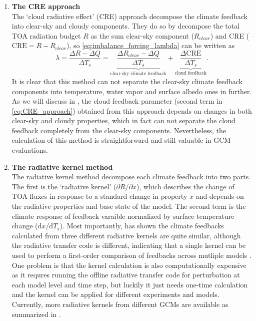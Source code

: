 \begin{enumerate}[label={(\arabic*)}]
    \item \textbf{The CRE approach}\\
    The `cloud radiative effect' (CRE) approach \citep[or CRF in][]{Cess1990intercomparison, Cess1996cloud} decompose the climate feedback into clear-sky and cloudy components. They do so by decompose the total TOA radiation budget $R$ as the sum clear-sky component ($R_{clear}$) and CRE ($\mathrm{CRE}=R-R_{clear}$), so \eqref{eq:imbalance_forcing_lambda} can be written as
    \begin{equation}
        \lambda = \frac{\Delta R - \Delta Q}{\Delta T_s} = \underbrace{\frac{\Delta R_{clear} - \Delta Q}{\Delta T_s}}_{\text{clear-sky climate feedback}} + \underbrace{\frac{\Delta\mathrm{CRE}}{\Delta T_s}}_{\text{cloud feedback}}.
        \label{eq:CRE_approach}
    \end{equation}
    It is clear that this method can not separate the clear-sky climate feedback components into temperature, water vapor and surface albedo ones in further. As we will discuss in , the cloud feedback parameter (second term in \eqref{eq:CRE_approach}) obtained from this approach depends on changes in both clear-sky and cloudy properties, which in fact can not separate the cloud feedback completely from the clear-sky components. Nevertheless, the calculation of this method is straightforward and still valuable in GCM evaluations.
    
    \item \textbf{The radiative kernel method}\\
    The radiative kernel method \citep[e.g.,][]{Soden2006,Soden2008,Shell2008} decompose each climate feedback into two parts. The first is the `radiative kernel' ($\partial R/\partial x$), which describes the change of TOA fluxes in response to a standard change in property $x$ and depends on the radiative properties and base state of the model. The second term is the climate response of feedback varaible normalized by surface temperature change ($\mathrm{d} x/\mathrm{d} T_s$). Most importantly, \cite{Soden2008} has shown the climate feedbacks calculated from three different radiative kernels are quite similar, although the radiative transfer code is different, indicating that a single kernel can be used to perform a first-order comparison of feedbacks across mutliple models \citep{Shell2008}. One problem is that the kernel calculation is also computationally expensive as it requres running the offline radiative transfer code for perturbation at each model level and time step, but luckily it just needs one-time calculation and the kernel can be applied for different experiments and models. Currently, more radiative kernels from different GCMs are available as summarized in .
\end{enumerate}   
    
